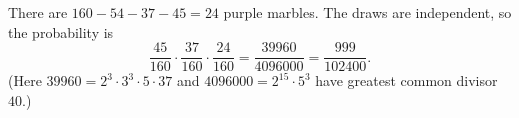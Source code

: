 There are $160-54-37-45=24$ purple marbles. The draws are independent, so the probability is
\[\dfrac{45}{160}\cdot\dfrac{37}{160}\cdot\dfrac{24}{160}=\dfrac{39960}{4096000}=\boxed{\dfrac{999}{102400}}.\]
(Here $39960=2^3\cdot3^3\cdot5\cdot37$ and $4096000=2^{15}\cdot5^3$ have greatest common divisor $40$.)
